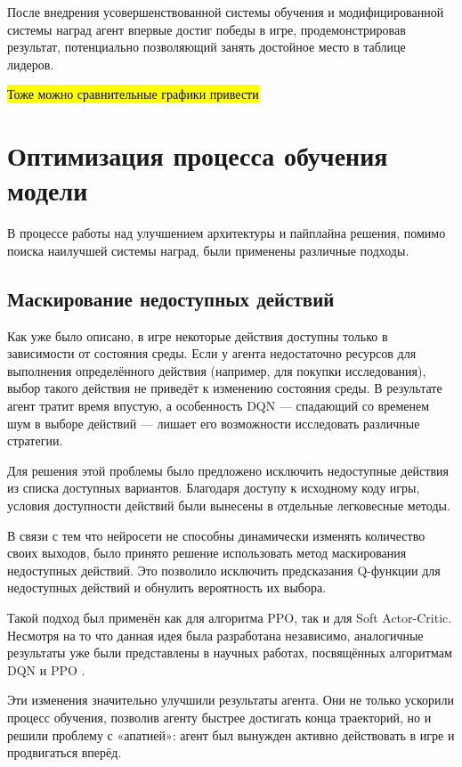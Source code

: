 \documentclass{article}
\begin{document}
После внедрения усовершенствованной системы обучения и модифицированной системы наград агент впервые достиг победы в игре, продемонстрировав результат, потенциально позволяющий занять достойное место в таблице лидеров.

\hl{Тоже можно сравнительные графики привести}

\section{Оптимизация процесса обучения модели}

В процессе работы над улучшением архитектуры и пайплайна решения, помимо поиска наилучшей системы наград, были применены различные подходы.

\subsection{Маскирование недоступных действий}

Как уже было описано, в игре некоторые действия доступны только в зависимости от состояния среды. 
Если у агента недостаточно ресурсов для выполнения определённого действия (например, для покупки исследования), выбор такого действия не приведёт к изменению состояния среды.
В результате агент тратит время впустую, а особенность DQN — спадающий со временем шум в выборе действий — лишает его возможности исследовать различные стратегии.

Для решения этой проблемы было предложено исключить недоступные действия из списка доступных вариантов.
Благодаря доступу к исходному коду игры, условия доступности действий были вынесены в отдельные легковесные методы.

В связи с тем что нейросети не способны динамически изменять количество своих выходов, было принято решение использовать метод маскирования недоступных действий.
Это позволило исключить предсказания Q-функции для недоступных действий и обнулить вероятность их выбора.

Такой подход был применён как для алгоритма PPO, так и для Soft Actor-Critic.
Несмотря на то что данная идея была разработана независимо, аналогичные результаты уже были представлены в научных работах, посвящённых алгоритмам DQN \cite{NEURIPS2018_645098b0} и  PPO \cite{TANG2020200}.

Эти изменения значительно улучшили результаты агента.
Они не только ускорили процесс обучения, позволив агенту быстрее достигать конца траекторий, но и решили проблему с «апатией»: агент был вынужден активно действовать в игре и продвигаться вперёд.
\end{document}
